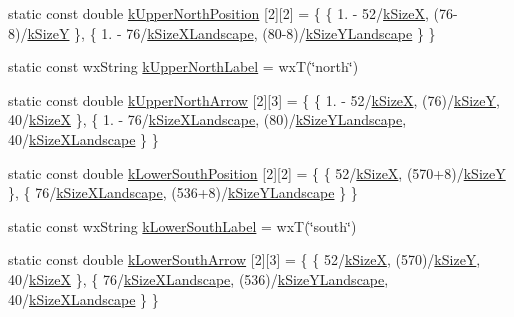\begin{DoxyCompactItemize}
\item 
static const double \hyperlink{a00222_a9dcacd107a2e4a921b5026c043a37bd7}{k\-Upper\-North\-Position} \mbox{[}2\mbox{]}\mbox{[}2\mbox{]} = \{ \{ 1. -\/ 52/\hyperlink{a00222_af38ec7276eab5e69e2b8b9b74c7e410d}{k\-Size\-X}, (76-\/8)/\hyperlink{a00222_a96b810fae104880234d8c31ca2b86416}{k\-Size\-Y} \}, \{ 1. -\/ 76/\hyperlink{a00222_a6a5b0e2bab47c3fb6da928006951ed06}{k\-Size\-X\-Landscape}, (80-\/8)/\hyperlink{a00222_a2874803a217d546e2cc3fe8647bc8506}{k\-Size\-Y\-Landscape} \} \}
\item 
static const wx\-String \hyperlink{a00222_a3dabf1a06c72414e629a674c0ae06757}{k\-Upper\-North\-Label} = wx\-T(\char`\"{}north\char`\"{})
\item 
static const double \hyperlink{a00222_a970471f971903377e8747f8fa2e542c6}{k\-Upper\-North\-Arrow} \mbox{[}2\mbox{]}\mbox{[}3\mbox{]} = \{ \{ 1. -\/ 52/\hyperlink{a00222_af38ec7276eab5e69e2b8b9b74c7e410d}{k\-Size\-X}, (76)/\hyperlink{a00222_a96b810fae104880234d8c31ca2b86416}{k\-Size\-Y}, 40/\hyperlink{a00222_af38ec7276eab5e69e2b8b9b74c7e410d}{k\-Size\-X} \}, \{ 1. -\/ 76/\hyperlink{a00222_a6a5b0e2bab47c3fb6da928006951ed06}{k\-Size\-X\-Landscape}, (80)/\hyperlink{a00222_a2874803a217d546e2cc3fe8647bc8506}{k\-Size\-Y\-Landscape}, 40/\hyperlink{a00222_a6a5b0e2bab47c3fb6da928006951ed06}{k\-Size\-X\-Landscape} \} \}
\item 
static const double \hyperlink{a00222_aa830d06b1305973520c2be2d713d4ce4}{k\-Lower\-South\-Position} \mbox{[}2\mbox{]}\mbox{[}2\mbox{]} = \{ \{ 52/\hyperlink{a00222_af38ec7276eab5e69e2b8b9b74c7e410d}{k\-Size\-X}, (570+8)/\hyperlink{a00222_a96b810fae104880234d8c31ca2b86416}{k\-Size\-Y} \}, \{ 76/\hyperlink{a00222_a6a5b0e2bab47c3fb6da928006951ed06}{k\-Size\-X\-Landscape}, (536+8)/\hyperlink{a00222_a2874803a217d546e2cc3fe8647bc8506}{k\-Size\-Y\-Landscape} \} \}
\item 
static const wx\-String \hyperlink{a00222_a985ac3dc5c3b5eb6c3fe605a9e296023}{k\-Lower\-South\-Label} = wx\-T(\char`\"{}south\char`\"{})
\item 
static const double \hyperlink{a00222_a422516853c2c729aa780a643e785b7f6}{k\-Lower\-South\-Arrow} \mbox{[}2\mbox{]}\mbox{[}3\mbox{]} = \{ \{ 52/\hyperlink{a00222_af38ec7276eab5e69e2b8b9b74c7e410d}{k\-Size\-X}, (570)/\hyperlink{a00222_a96b810fae104880234d8c31ca2b86416}{k\-Size\-Y}, 40/\hyperlink{a00222_af38ec7276eab5e69e2b8b9b74c7e410d}{k\-Size\-X} \}, \{ 76/\hyperlink{a00222_a6a5b0e2bab47c3fb6da928006951ed06}{k\-Size\-X\-Landscape}, (536)/\hyperlink{a00222_a2874803a217d546e2cc3fe8647bc8506}{k\-Size\-Y\-Landscape}, 40/\hyperlink{a00222_a6a5b0e2bab47c3fb6da928006951ed06}{k\-Size\-X\-Landscape} \} \}

\end{DoxyCompactItemize}

